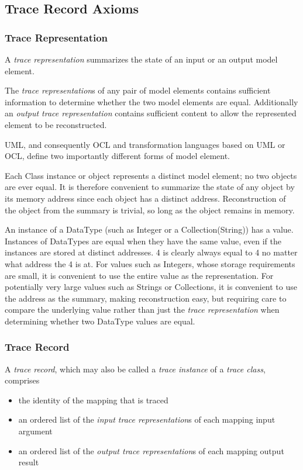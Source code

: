 \documentclass[runningheads,a4paper]{llncs}
\begin{document}
\subsection{Trace Record Axioms}

\subsubsection{Trace Representation}

A \emph{trace representation} summarizes the state of an input or an output model element.

The \emph{trace representation}s of any pair of model elements contains sufficient information to determine whether the two model elements are equal. Additionally an \emph{output trace representation} contains sufficient content to allow the represented element to be reconstructed.

UML, and consequently OCL and transformation languages based on UML or OCL, define two importantly different forms of model element.

Each Class instance or object represents a distinct model element; no two objects are ever equal. It is therefore convenient to summarize the state of any object by its memory address since each object has a distinct address. Reconstruction of the object from the summary is trivial, so long as the object remains in memory.

An instance of a DataType (such as Integer or a Collection(String)) has a value. Instances of DataTypes are equal when they have the same value, even if the instances are stored at distinct addresses. 4 is clearly always equal to 4 no matter what address the 4 is at. 
For values such as Integers, whose storage requirements are small, it is convenient to use the entire value as the representation. For potentially very large values such as Strings or Collections, it is convenient to use the address as the summary, making reconstruction easy, but requiring care to compare the underlying value rather than just the \emph{trace representation} when determining whether two DataType values are equal.

\subsubsection{Trace Record}

A \emph{trace record}, which may also be called a \emph{trace instance} of a \emph{trace class}, comprises
\begin{itemize}
\item the identity of the mapping that is traced
\item an ordered list of the \emph{input trace representation}s of each mapping input argument
\item an ordered list of the \emph{output trace representation}s of each mapping output result
\end{itemize}
\end{document}
